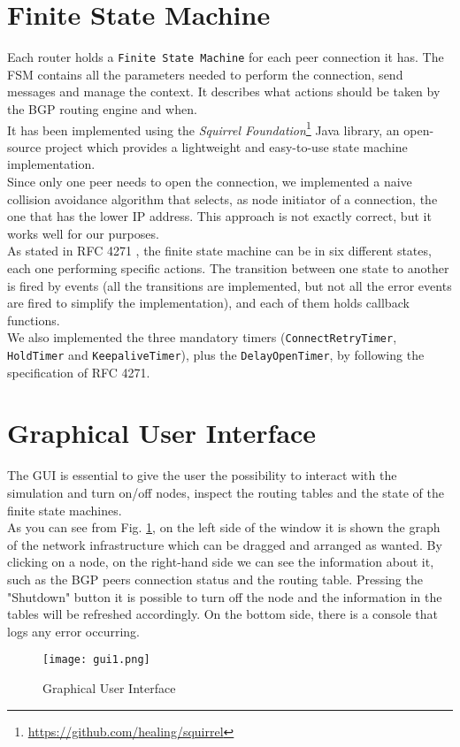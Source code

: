 \section{Finite State Machine}\label{fsm}
Each router holds a \texttt{Finite State Machine} for each peer connection it has. The FSM contains all the parameters needed to perform the connection, send messages and manage the context. It describes what actions should be taken by the BGP routing engine and when.\\
It has been implemented using the \textit{Squirrel Foundation}\footnote{\url{https://github.com/healing/squirrel}} Java library, an open-source project which provides a lightweight and easy-to-use state machine implementation.\\
Since only one peer needs to open the connection, we implemented a naive collision avoidance algorithm that selects, as node initiator of a connection, the one that has the lower IP address. This approach is not exactly correct, but it works well for our purposes.\\
As stated in RFC 4271 \cite{rfc4271}, the finite state machine can be in six different states, each one performing specific actions. The transition between one state to another is fired by events (all the transitions are implemented, but not all the error events are fired to simplify the implementation), and each of them holds callback functions.\\
We also implemented the three mandatory timers (\texttt{ConnectRetryTimer}, \texttt{HoldTimer} and \texttt{KeepaliveTimer}), plus the \texttt{DelayOpenTimer}, by following the specification of RFC 4271.

\section{Graphical User Interface}
The GUI is essential to give the user the possibility to interact with the simulation and turn on/off nodes, inspect the routing tables and the state of the finite state machines.\\
As you can see from Fig. \ref{fig:gui}, on the left side of the window it is shown the graph of the network infrastructure which can be dragged and arranged as wanted. By clicking on a node, on the right-hand side we can see the information about it, such as the BGP peers connection status and the routing table. Pressing the "Shutdown" button it is possible to turn off the node and the information in the tables will be refreshed accordingly.
On the bottom side, there is a console that logs any error occurring.
\begin{figure}[h]
 \centering
 \texttt{[image: gui1.png]}
 \caption{Graphical User Interface}
 \label{fig:gui}
\end{figure}



